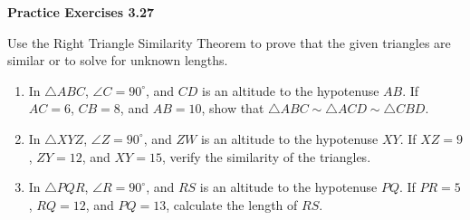 \vspace{0.3ex}
\noindent\textbf{Practice Exercises 3.27}

\vspace{0.2ex}

Use the Right Triangle Similarity Theorem to prove that the given triangles are similar or to solve for unknown lengths.

\begin{enumerate}[label=\color{blue}\arabic*.]
    \item In \(\triangle ABC\), \(\angle C = 90^\circ\), and \(CD\) is an altitude to the hypotenuse \(AB\). If \(AC = 6\), \(CB = 8\), and \(AB = 10\), show that \(\triangle ABC \sim \triangle ACD \sim \triangle CBD\).
    \item In \(\triangle XYZ\), \(\angle Z = 90^\circ\), and \(ZW\) is an altitude to the hypotenuse \(XY\). If \(XZ = 9\), \(ZY = 12\), and \(XY = 15\), verify the similarity of the triangles.
    \item In \(\triangle PQR\), \(\angle R = 90^\circ\), and \(RS\) is an altitude to the hypotenuse \(PQ\). If \(PR = 5\), \(RQ = 12\), and \(PQ = 13\), calculate the length of \(RS\).
\end{enumerate}
